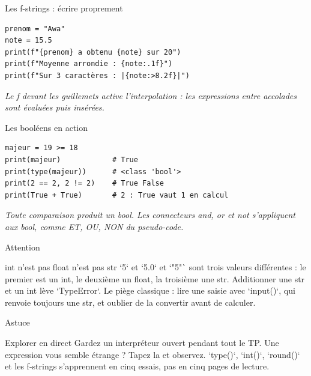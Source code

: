 \documentclass[aspectratio=169,11pt]{beamer}
\begin{document}
\begin{frame}[fragile]{Les f-strings : écrire proprement}

\begin{lstlisting}[style=py]
prenom = "Awa"
note = 15.5
print(f"{prenom} a obtenu {note} sur 20")
print(f"Moyenne arrondie : {note:.1f}")
print(f"Sur 3 caractères : |{note:>8.2f}|")
\end{lstlisting}
\vspace{0.5pt}

{\small\color{PyGris}\itshape Le f devant les guillemets active l'interpolation : les expressions entre accolades sont évaluées puis insérées.}

\end{frame}

\begin{frame}[fragile]{Les booléens en action}

\begin{lstlisting}[style=py]
majeur = 19 >= 18
print(majeur)            # True
print(type(majeur))      # <class 'bool'>
print(2 == 2, 2 != 2)    # True False
print(True + True)       # 2 : True vaut 1 en calcul
\end{lstlisting}
\vspace{0.5pt}

{\small\color{PyGris}\itshape Toute comparaison produit un bool. Les connecteurs and, or et not s'appliquent aux bool, comme ET, OU, NON du pseudo-code.}

\end{frame}

\begin{frame}{Attention}
\begin{alertblock}{int n'est pas float n'est pas str}
`5` et `5.0` et `"5"` sont trois valeurs différentes : le premier est un int, le deuxième un float, la troisième une str. Additionner une str et un int lève `TypeError`. Le piège classique : lire une saisie avec `input()`, qui renvoie toujours une str, et oublier de la convertir avant de calculer.
\end{alertblock}
\end{frame}

\begin{frame}{Astuce}
\begin{exampleblock}{Explorer en direct}
Gardez un interpréteur ouvert pendant tout le TP. Une expression vous semble étrange ? Tapez la et observez. `type()`, `int()`, `round()` et les f-strings s'apprennent en cinq essais, pas en cinq pages de lecture.
\end{exampleblock}
\end{frame}
\end{document}
